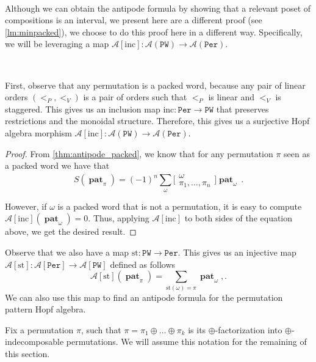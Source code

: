 \documentclass[12pt, reqno]{amsart}
\theoremstyle{definition}
\DeclareMathOperator{\pat}{\mathbf{pat}}
\begin{document}
\

Although we can obtain the antipode formula by showing that a relevant poset of compositions is an interval, we present here are a different proof (see \cref{lm:minpacked}), we choose to do this proof here in a different way.
Specifically, we will be leveraging a map $\mathcal A[\mathrm{inc}]: \mathcal A(\mathtt{PW}) \to \mathcal A(\mathtt{Per})$.

\

First, observe that any permutation is a packed word, because any pair of linear orders $(<_P, <_V)$ is a pair of orders such that $<_P$ is linear and $<_V$ is staggered.
This gives us an inclusion map $\mathrm{inc} : \mathtt{Per} \to \mathtt{PW}$ that preserves restrictions and the monoidal structure.
Therefore, this gives us a surjective Hopf algebra morphism $\mathcal A[\mathrm{inc}]: \mathcal A(\mathtt{PW}) \to \mathcal A(\mathtt{Per})$.


\begin{proof}
From \cref{thm:antipode_packed}, we know that for any permutation $\pi$ seen as a packed word we have that
$$S(\pat_{\pi}) = (-1)^n \sum_{\omega} \bigl[\!\begin{smallmatrix} \omega \\ \pi_1, \dots, \pi_n \end{smallmatrix}\!\bigr] \pat_{\omega}\, . $$

However, if $\omega$ is a packed word that is not a permutation, it is easy to compute $\mathcal A[\mathrm{inc}] (\pat_{\omega}) = 0$.
Thus, applying $\mathcal A[\mathrm{inc}]$ to both sides of the equation above, we get the desired result.
\end{proof}

Observe that we also have a map $\mathrm{st}: \mathtt{PW} \to \mathtt{Per}$.
This gives us an injective map $\mathcal A[\mathrm{st}]: \mathcal A[\mathtt{Per}] \to  \mathcal A[\mathtt{PW}] $ defined as follows
$$\mathcal A[\mathrm{st}] (\pat_{\pi} ) = \sum_{\mathrm{st}(\omega ) = \pi} \pat_{\omega}, . $$
We can also use this map to find an antipode formula for the permutation pattern Hopf algebra.



Fix a permutation $\pi $, such that $\pi = \pi_1 \oplus \dots \oplus \pi_k $ is its $\oplus$-factorization into $\oplus$-indecomposable permutations.
We will assume this notation for the remaining of this section.
\end{document}
